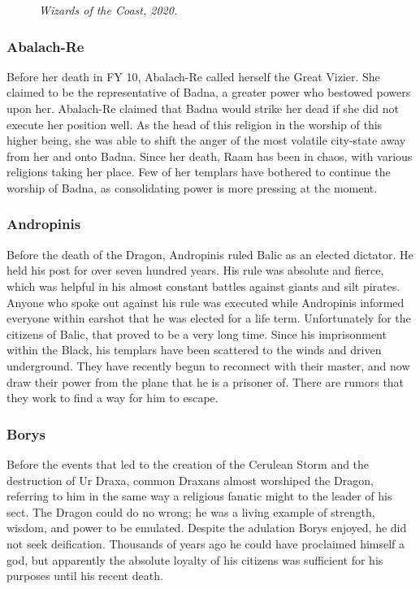\begin{figure}[t!]
\par\textit{\small\textcopyright Wizards of the Coast, 2020.}
\end{figure}

\subsubsection{Abalach-Re}
Before her death in FY 10, Abalach-Re called herself the Great Vizier. She claimed to be the representative of Badna, a greater power who bestowed powers upon her. Abalach-Re claimed that Badna would strike her dead if she did not execute her position well. As the head of this religion in the worship of this higher being, she was able to shift the anger of the most volatile city-state away from her and onto Badna. Since her death, Raam has been in chaos, with various religions taking her place. Few of her templars have bothered to continue the worship of Badna, as consolidating power is more pressing at the moment.

\subsubsection{Andropinis}
Before the death of the Dragon, Andropinis ruled Balic as an elected dictator. He held his post for over seven hundred years. His rule was absolute and fierce, which was helpful in his almost constant battles against giants and silt pirates. Anyone who spoke out against his rule was executed while Andropinis informed everyone within earshot that he was elected for a life term. Unfortunately for the citizens of Balic, that proved to be a very long time. Since his imprisonment within the Black, his templars have been scattered to the winds and driven underground. They have recently begun to reconnect with their master, and now draw their power from the plane that he is a prisoner of. There are rumors that they work to find a way for him to escape.

\subsubsection{Borys}
Before the events that led to the creation of the Cerulean Storm and the destruction of Ur Draxa, common Draxans almost worshiped the Dragon, referring to him in the same way a religious fanatic might to the leader of his sect. The Dragon could do no wrong; he was a living example of strength, wisdom, and power to be emulated. Despite the adulation Borys enjoyed, he did not seek deification. Thousands of years ago he could have proclaimed himself a god, but apparently the absolute loyalty of his citizens was sufficient for his purposes until his recent death.

